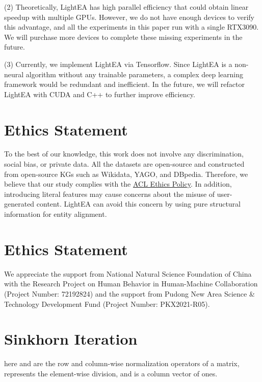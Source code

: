 \documentclass[11pt]{article}
\begin{document}
(2) Theoretically, LightEA has high parallel efficiency that could obtain linear speedup with multiple GPUs.
However, we do not have enough devices to verify this advantage, and all the experiments in this paper run with a single RTX3090.
We will purchase more devices to complete these missing experiments in the future.

(3) Currently, we implement LightEA via Tensorflow.
Since LightEA is a non-neural algorithm without any trainable parameters, a complex deep learning framework would be redundant and inefficient.
In the future, we will refactor LightEA with CUDA and C++ to further improve efficiency.


\section*{Ethics Statement}
To the best of our knowledge, this work does not involve any discrimination, social bias, or private data.
All the datasets are open-source and constructed from open-source KGs such as Wikidata, YAGO, and DBpedia.
Therefore, we believe that our study complies with the \href{https://www.aclweb.org/portal/content/acl-code-ethics}{ACL Ethics Policy}.
In addition, introducing literal features may cause concerns about the misuse of user-generated content.
LightEA can avoid this concern by using pure structural information for entity alignment.

\section*{Ethics Statement}
We appreciate the support from National Natural Science Foundation of China with the Research Project on Human Behavior in Human-Machine Collaboration (Project Number: 72192824) and the support from Pudong New Area Science \& Technology Development Fund (Project Number: PKX2021-R05).





\clearpage
\appendix

\section{Sinkhorn Iteration}
\label{apd:sinkhorn}

here {\small} and {\small } are the row and column-wise normalization operators of a matrix,  represents the element-wise division, and  is a column vector of ones.
\end{document}
